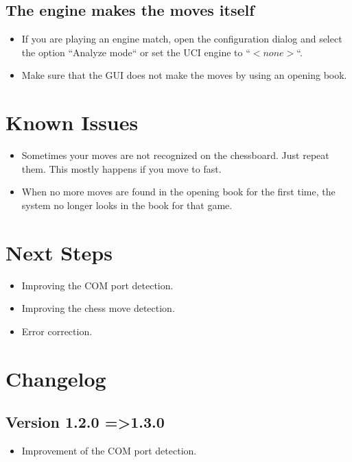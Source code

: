\documentclass[11pt,a4paper]{article}
\begin{document}
\subsection{The engine makes the moves itself}
\begin{itemize}
\item If you are playing an engine match, open the configuration dialog and select the option ``Analyze mode`` or set the UCI engine to ``\begin{math}<none>\end{math}``.
\item Make sure that the GUI does not make the moves by using an opening book.
\end{itemize}

\section{Known Issues}
\begin{itemize}
    \item Sometimes your moves are not recognized on the chessboard. Just repeat them. This mostly happens if you move to fast.
	\item When no more moves are found in the opening book for the first time, the system no longer looks in the book for that game.
\end{itemize}

\section{Next Steps}
\begin{itemize}
	\item Improving the COM port detection.
	\item Improving the chess move detection.
	\item Error correction.
\end{itemize}

\pagebreak

\section{Changelog}
\subsection{Version 1.2.0 =\textgreater 1.3.0}
\begin{itemize}
	\item Improvement of the COM port detection.
\end{itemize}
\end{document}
